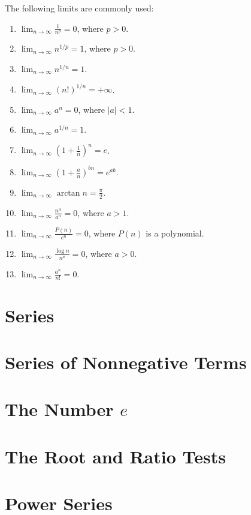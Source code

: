 \documentclass[11pt]{book}
\theoremstyle{definition}
\theoremstyle{plain}
\begin{document}
The following limits are commonly used:
\begin{enumerate}
\item $\displaystyle \lim_{n\to\infty} \frac{1}{n^p} = 0$, where $p>0$.
\item $\displaystyle \lim_{n\to\infty} n^{1/p} = 1$, where $p>0$.
\item $\displaystyle \lim_{n\to\infty} n^{1/n} = 1$.
\item $\displaystyle \lim_{n\to\infty} (n!)^{1/n} = +\infty$.
\item $\displaystyle \lim_{n\to\infty} a^n = 0$, where $|a|<1$.
\item $\displaystyle \lim_{n\to\infty} a^{1/n} = 1$.
\item $\displaystyle \lim_{n\to\infty} \left(1+\frac{1}{n}\right)^n = e$.
\item $\displaystyle \lim_{n\to\infty} \left(1+\frac{a}{n}\right)^{bn} = e^{ab}$.
\item $\displaystyle \lim_{n\to\infty} \arctan n = \frac{\pi}{2}$.
\item $\displaystyle \lim_{n\to\infty} \frac{n^\alpha}{a^n} = 0$, where $a>1$.
\item $\displaystyle \lim_{n\to\infty} \frac{P(n)}{e^n} = 0$, where $P(n)$ is a polynomial.
\item $\displaystyle \lim_{n\to\infty} \frac{\log n}{n^a} = 0$, where $a>0$.
\item $\displaystyle \lim_{n\to\infty} \frac{a^n}{n!} = 0$.
\end{enumerate}

\section{Series}

\section{Series of Nonnegative Terms}

\section{The Number \texorpdfstring{$e$}{e}}

\section{The Root and Ratio Tests}

\section{Power Series}
\end{document}
